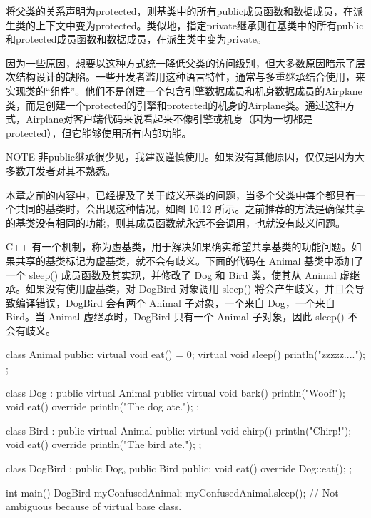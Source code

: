 将父类的关系声明为protected，则基类中的所有public成员函数和数据成员，在派生类的上下文中变为protected。类似地，指定private继承则在基类中的所有public和protected成员函数和数据成员，在派生类中变为private。

因为一些原因，想要以这种方式统一降低父类的访问级别，但大多数原因暗示了层次结构设计的缺陷。一些开发者滥用这种语言特性，通常与多重继承结合使用，来实现类的“组件”。他们不是创建一个包含引擎数据成员和机身数据成员的Airplane类，而是创建一个protected的引擎和protected的机身的Airplane类。通过这种方式，Airplane对客户端代码来说看起来不像引擎或机身（因为一切都是protected），但它能够使用所有内部功能。

\begin{myNotic}{NOTE}
非public继承很少见，我建议谨慎使用。如果没有其他原因，仅仅是因为大多数开发者对其不熟悉。
\end{myNotic}


本章之前的内容中，已经提及了关于歧义基类的问题，当多个父类中每个都具有一个共同的基类时，会出现这种情况，如图 10.12 所示。之前推荐的方法是确保共享的基类没有相同的功能，则其成员函数就永远不会调用，也就没有歧义问题。


C++ 有一个机制，称为虚基类，用于解决如果确实希望共享基类的功能问题。如果共享的基类标记为虚基类，就不会有歧义。下面的代码在 Animal 基类中添加了一个 sleep() 成员函数及其实现，并修改了 Dog 和 Bird 类，使其从 Animal 虚继承。如果没有使用虚基类，对 DogBird 对象调用 sleep() 将会产生歧义，并且会导致编译错误，DogBird 会有两个 Animal 子对象，一个来自 Dog，一个来自 Bird。当 Animal 虚继承时，DogBird 只有一个 Animal 子对象，因此 sleep() 不会有歧义。

\begin{cpp}
class Animal
{
    public:
        virtual void eat() = 0;
        virtual void sleep() { println("zzzzz...."); }
};

class Dog : public virtual Animal
{
    public:
        virtual void bark() { println("Woof!"); }
        void eat() override { println("The dog ate."); }
};

class Bird : public virtual Animal
{
    public:
        virtual void chirp() { println("Chirp!"); }
        void eat() override { println("The bird ate."); }
};

class DogBird : public Dog, public Bird
{
    public:
        void eat() override { Dog::eat(); }
};

int main()
{
    DogBird myConfusedAnimal;
    myConfusedAnimal.sleep(); // Not ambiguous because of virtual base class.
}
\end{cpp}

